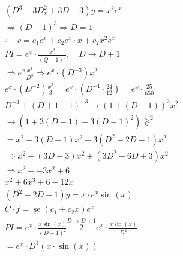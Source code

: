 \documentclass[12pt, a4paper]{article}
\begin{document}
	\begin{align*}
		 & \left(D^{3}-3 D_{x}^{2}+3 D-3\right) y=x^2 e^{x}                                                                             \\
		 & \Rightarrow(D-1)^{3} \Rightarrow D=1                                                                                         \\
		 & \therefore \quad c=c_{1} e^{x}+c_{2} e^{x} \cdot x+c_{2} x^2 e^{x}                                                           \\
		 & P I=e^{x} \cdot \frac{x^2 }{(Q-1)^{3}}, \quad D \rightarrow D+1                                                              \\
		 & \Rightarrow e^{x} \frac{x^2 }{D^{3}} \Rightarrow e^{x} \cdot\left(D^{-3}\right) x^2                                          \\
		 & e^{x} \cdot\left(D^{-2}\right) \frac{x^{3}}{3}=e^{x} \cdot\left(D^{-1} \cdot \frac{24}{12}\right)=e^{x} \cdot \frac{25}{650} \\
		 & D^{-3}+(D+1-1)^{-3} \rightarrow(1+(D-1))^{3} x^2                                                                             \\
		 & \rightarrow\left(1+3(D-1)+3(D-1)^{2}\right) \gtrless^{2}                                                                     \\
		 & =x^2 +3(D-1) x^2 +3\left(D^{2}-2 D+1\right) x^2                                                                              \\
		 & \Rightarrow x^2 +(3 D-3) x^2 +\left(3 D^{2}-6 D+3\right) x^2                                                                 \\
		 & \Rightarrow x^2 +-3 x^2 +6                                                                                                   \\
		 & x^2 +6 x^{3}+6-12 x  \tag{1}                                                                                                 \\
		 & \left(D^{2}-2 D+1\right) y=x \cdot e^{x} \sin(x)                                                                             \\
		 & C \cdot f=\operatorname{se}\left(c_{1}+c_{2} x\right) e^{x}                                                                  \\
		 & P I=e^{x} \cdot \frac{x \sin(x)}{(D-1)^{2}} \stackrel{D \rightarrow D+1}{2} e^{x} \cdot \frac{x \sin(x)}{D^{2}}              \\
		 & =e^{x} \cdot D^{1}(x \cdot \sin(x))
	\end{align*}
\end{document}
